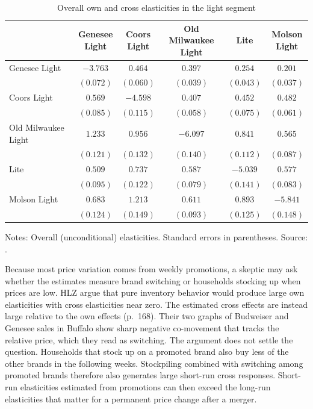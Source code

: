 \begin{table}[htbp]
\centering
\caption{Overall own and cross elasticities in the light segment}\label{tab:05-hlz-light}
\begin{threeparttable}
\begin{tabular}{@{}lccccc@{}}
\toprule
 & \makecell{Genesee\\ Light} & \makecell{Coors\\ Light} & \makecell{Old Milwaukee\\ Light} & Lite
 & \makecell{Molson\\ Light} \\
\midrule
Genesee Light & $-3.763$ & $0.464$ & $0.397$ & $0.254$ & $0.201$ \\
 & $(0.072)$ & $(0.060)$ & $(0.039)$ & $(0.043)$ & $(0.037)$ \\
Coors Light & $0.569$ & $-4.598$ & $0.407$ & $0.452$ & $0.482$ \\
 & $(0.085)$ & $(0.115)$ & $(0.058)$ & $(0.075)$ & $(0.061)$ \\
Old Milwaukee Light & $1.233$ & $0.956$ & $-6.097$ & $0.841$ & $0.565$ \\
 & $(0.121)$ & $(0.132)$ & $(0.140)$ & $(0.112)$ & $(0.087)$ \\
Lite & $0.509$ & $0.737$ & $0.587$ & $-5.039$ & $0.577$ \\
 & $(0.095)$ & $(0.122)$ & $(0.079)$ & $(0.141)$ & $(0.083)$ \\
Molson Light & $0.683$ & $1.213$ & $0.611$ & $0.893$ & $-5.841$ \\
 & $(0.124)$ & $(0.149)$ & $(0.093)$ & $(0.125)$ & $(0.148)$ \\
\bottomrule
\end{tabular}
\begin{tablenotes}[flushleft]\footnotesize
\item Notes: Overall (unconditional) elasticities. Standard errors in parentheses. Source:
\citet[Table 5, lower panel]{HausmanLeonardZona1994}.
\end{tablenotes}
\end{threeparttable}
\end{table}

Because most price variation comes from weekly promotions, a skeptic may ask whether the estimates measure brand
switching or households stocking up when prices are low. HLZ argue that pure inventory behavior would produce
large own elasticities with cross elasticities near zero. The estimated cross effects are instead large relative
to the own effects (p.~168). Their two graphs of Budweiser and Genesee sales in Buffalo show sharp negative
co-movement that tracks the relative price, which they read as switching. The argument does not settle the
question. Households that stock up on a promoted brand also buy less of the other brands in the following weeks.
Stockpiling combined with switching among promoted brands therefore also generates large short-run cross
responses.
Short-run elasticities estimated from promotions can then exceed the long-run elasticities that matter for a
permanent price change after a merger.

